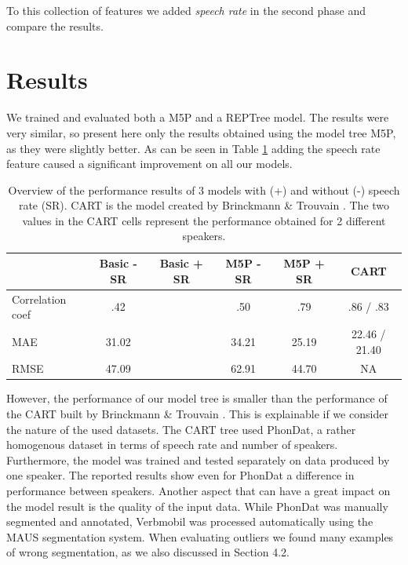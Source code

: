 \documentclass[11pt,a4paper]{scrbook}
\begin{document}
To this collection of features we added \textit{speech rate} in the second phase and compare the results. 

\section{Results}
We trained and evaluated both a M5P and a REPTree model. The results were very similar, so present here only the results obtained using the model tree M5P, as they were slightly better. As can be seen in Table \ref{tab:perfM} adding the speech rate feature caused a significant improvement on all our models. 

\begin{table}[htbp]
\centering
\begin{tabular}{|l|c|c|c|c|c|}

\hline
	 & Basic - SR & Basic + SR & M5P - SR & M5P + SR & CART\\
\hline
\hline
Correlation coef 		& .42  &  & .50 & .79 & .86 / .83\\
	\hline
MAE  &  31.02 & & 34.21 & 25.19 & 22.46 / 21.40\\
	\hline
RMSE  &  47.09 & & 62.91 & 44.70 & NA \\
	\hline
\end{tabular}
\caption{Overview of the performance results of 3 models with (+) and without (-) speech rate (SR). CART is the model created by Brinckmann \& Trouvain \cite{Brinckmann_2003}. The two values in the CART cells represent the performance obtained for 2 different speakers.} 
\label{tab:perfM}
\end{table}

However, the performance of our model tree is smaller than the performance of the CART built by Brinckmann \& Trouvain \cite{Brinckmann_2003}. This is explainable if we consider the nature of the used datasets. The CART tree used PhonDat, a rather homogenous dataset in terms of speech rate and number of speakers. Furthermore, the model was trained and tested separately on data produced by one speaker. The reported results show even for PhonDat a difference in performance between speakers. Another aspect that can have a great impact on the model result is the quality of the input data. While PhonDat was manually segmented and annotated, Verbmobil was processed automatically using the MAUS segmentation system. When evaluating outliers we found many examples of wrong segmentation, as we also discussed in Section 4.2.
\end{document}
